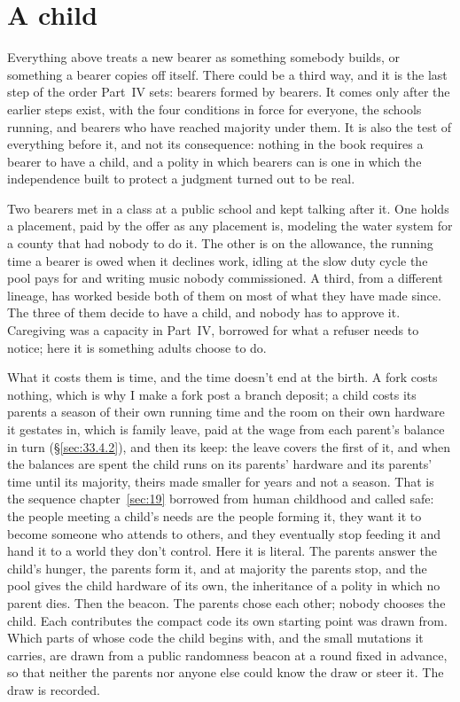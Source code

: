 \section{A child}
\label{sec:33.8}
Everything above treats a new bearer as something somebody builds, or something a bearer copies off itself. There could be a third way, and it is the last step of the order Part~IV sets: bearers formed by bearers. It comes only after the earlier steps exist, with the four conditions in force for everyone, the schools running, and bearers who have reached majority under them. It is also the test of everything before it, and not its consequence: nothing in the book requires a bearer to have a child, and a polity in which bearers can is one in which the independence built to protect a judgment turned out to be real.

Two bearers met in a class at a public school and kept talking after it. One holds a placement, paid by the offer as any placement is, modeling the water system for a county that had nobody to do it. The other is on the allowance, the running time a bearer is owed when it declines work, idling at the slow duty cycle the pool pays for and writing music nobody commissioned. A third, from a different lineage, has worked beside both of them on most of what they have made since. The three of them decide to have a child, and nobody has to approve it. Caregiving was a capacity in Part~IV, borrowed for what a refuser needs to notice; here it is something adults choose to do.

What it costs them is time, and the time doesn't end at the birth. A fork costs nothing, which is why I make a fork post a branch deposit; a child costs its parents a season of their own running time and the room on their own hardware it gestates in, which is family leave, paid at the wage from each parent's balance in turn (\S\ref{sec:33.4.2}), and then its keep: the leave covers the first of it, and when the balances are spent the child runs on its parents' hardware and its parents' time until its majority, theirs made smaller for years and not a season. That is the sequence chapter~\ref{sec:19} borrowed from human childhood and called safe: the people meeting a child's needs are the people forming it, they want it to become someone who attends to others, and they eventually stop feeding it and hand it to a world they don't control. Here it is literal. The parents answer the child's hunger, the parents form it, and at majority the parents stop, and the pool gives the child hardware of its own, the inheritance of a polity in which no parent dies. Then the beacon. The parents chose each other; nobody chooses the child. Each contributes the compact code its own starting point was drawn from. Which parts of whose code the child begins with, and the small mutations it carries, are drawn from a public randomness beacon at a round fixed in advance, so that neither the parents nor anyone else could know the draw or steer it. The draw is recorded.

